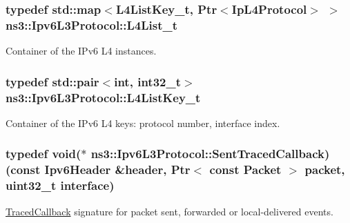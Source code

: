 \subsubsection[{\texorpdfstring{L4\+List\+\_\+t}{L4List_t}}]{\setlength{\rightskip}{0pt plus 5cm}typedef std\+::map$<${\bf L4\+List\+Key\+\_\+t}, {\bf Ptr}$<${\bf Ip\+L4\+Protocol}$>$ $>$ {\bf ns3\+::\+Ipv6\+L3\+Protocol\+::\+L4\+List\+\_\+t}\hspace{0.3cm}{\ttfamily [private]}}\hypertarget{classns3_1_1Ipv6L3Protocol_a081eeffb80d91d0702285b6bb5687082}{}\label{classns3_1_1Ipv6L3Protocol_a081eeffb80d91d0702285b6bb5687082}


Container of the I\+Pv6 L4 instances. 

\subsubsection[{\texorpdfstring{L4\+List\+Key\+\_\+t}{L4ListKey_t}}]{\setlength{\rightskip}{0pt plus 5cm}typedef std\+::pair$<$int, int32\+\_\+t$>$ {\bf ns3\+::\+Ipv6\+L3\+Protocol\+::\+L4\+List\+Key\+\_\+t}\hspace{0.3cm}{\ttfamily [private]}}\hypertarget{classns3_1_1Ipv6L3Protocol_ade8066a20a3494dbda177322b1d18c21}{}\label{classns3_1_1Ipv6L3Protocol_ade8066a20a3494dbda177322b1d18c21}


Container of the I\+Pv6 L4 keys\+: protocol number, interface index. 

\subsubsection[{\texorpdfstring{Sent\+Traced\+Callback}{SentTracedCallback}}]{\setlength{\rightskip}{0pt plus 5cm}typedef void($\ast$  ns3\+::\+Ipv6\+L3\+Protocol\+::\+Sent\+Traced\+Callback) (const {\bf Ipv6\+Header} \&header, {\bf Ptr}$<$ const {\bf Packet} $>$ packet, uint32\+\_\+t interface)}\hypertarget{classns3_1_1Ipv6L3Protocol_a15e365bcfa93746691e7acf8a9ef7718}{}\label{classns3_1_1Ipv6L3Protocol_a15e365bcfa93746691e7acf8a9ef7718}
\hyperlink{classns3_1_1TracedCallback}{Traced\+Callback} signature for packet sent, forwarded or local-\/delivered events.


